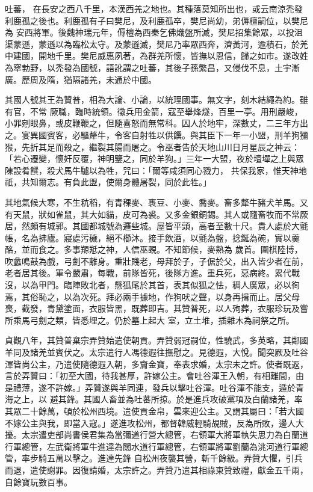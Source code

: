 
\begin{pinyinscope}

 吐蕃，
 在長安之西八千里，本漢西羌之地也。其種落莫知所出也，或云南涼禿發利鹿孤之後也。利鹿孤有子曰樊尼，及利鹿孤卒，樊尼尚幼，弟傉檀嗣位，以樊尼為
 安西將軍。後魏神瑞元年，傉檀為西秦乞佛熾盤所滅，樊尼招集餘眾，以投沮渠蒙遜，蒙遜以為臨松太守。及蒙遜滅，樊尼乃率眾西奔，濟黃河，逾積石，於羌中建國，開地千里。樊尼威惠夙著，為群羌所懷，皆撫以恩信，歸之如市。遂改姓為窣勃野，以禿發為國號，語訛謂之吐蕃，其後子孫繁昌，又侵伐不息，土宇漸廣。歷周及隋，猶隔諸羌，未通於中國。



 其國人號其王為贊普，相為大論、小論，以統理國事。無文字，刻木結繩為約。雖有官，不常
 厥職，臨時統領。徵兵用金箭，寇至舉烽燧，百里一亭。用刑嚴峻，小罪剜眼鼻，或皮鞭鞭之，但隨喜怒而無常科。囚人於地牢，深數丈，二三年方出之。宴異國賓客，必驅犛牛，令客自射牲以供饌。與其臣下一年一小盟，刑羊狗獼猴，先折其足而殺之，繼裂其腸而屠之。令巫者告於天地山川日月星辰之神云：「若心遷變，懷奸反覆，神明鑒之，同於羊狗。」三年一大盟，夜於壇墠之上與眾陳設肴饌，殺犬馬牛驢以為牲，咒曰：「爾等咸須同心戮力，
 共保我家，惟天神地祇，共知爾志。有負此盟，使爾身體屠裂，同於此牲。」



 其地氣候大寒，不生秔稻，有青稞麥、褭豆、小麥、喬麥。畜多犛牛豬犬羊馬。又有天鼠，狀如雀鼠，其大如貓，皮可為裘。又多金銀銅錫。其人或隨畜牧而不常厥居，然頗有城郭。其國都城號為邏些城。屋皆平頭，高者至數十尺。貴人處於大氈帳，名為拂廬。寢處污穢，絕不櫛沐。接手飲酒，以氈為盤，捻鋋為碗，實以羹酪，並而食之。多事羱羝之神，人信巫覡。不知節候，麥熟為
 歲首。圍棋陸博，吹蠡鳴鼓為戲，弓劍不離身。重壯賤老，母拜於子，子倨於父，出入皆少者在前，老者居其後。軍令嚴肅，每戰，前隊皆死，後隊方進。重兵死，惡病終。累代戰沒，以為甲門。臨陣敗北者，懸狐尾於其首，表其似狐之怯，稠人廣眾，必以徇焉，其俗恥之，以為次死。拜必兩手據地，作狗吠之聲，以身再揖而止。居父母喪，截發，青黛塗面，衣服皆黑，既葬即吉。其贊普死，以人殉葬，衣服珍玩及嘗所乘馬弓劍之類，皆悉埋之。仍於墓上起大
 室，立土堆，插雜木為祠祭之所。



 貞觀八年，其贊普棄宗弄贊始遣使朝貢。弄贊弱冠嗣位，性驍武，多英略，其鄰國羊同及諸羌並賓伏之。太宗遣行人馮德遐往撫慰之。見德遐，大悅。聞突厥及吐谷渾皆尚公主，乃遣使隨德遐入朝，多齎金寶，奉表求婚，太宗未之許。使者既返，言於弄贊曰：「初至大國，待我甚厚，許嫁公主。會吐谷渾王入朝，有相離間，由是禮薄，遂不許嫁。」弄贊遂與羊同連，發兵以擊吐谷渾。吐谷渾不能支，遁於青海之上，以
 避其鋒。其國人畜並為吐蕃所掠。於是進兵攻破黨項及白蘭諸羌，率其眾二十餘萬，頓於松州西境。遣使貢金帛，雲來迎公主。又謂其屬曰：「若大國不嫁公主與我，即當入寇。」遂進攻松州，都督韓威輕騎覘賊，反為所敗，邊人大擾。太宗遣吏部尚書侯君集為當彌道行營大總管，右領軍大將軍執失思力為白蘭道行軍總管，左武衛將軍牛進達為闊水道行軍總管，右領軍將軍劉蘭為洮河道行軍總管，率步騎五萬以擊之。進達先鋒
 自松州夜襲其營，斬千餘級。弄贊大懼，引兵而退，遣使謝罪。因復請婚，太宗許之。弄贊乃遣其相祿東贊致禮，獻金五千兩，自餘寶玩數百事。




\end{pinyinscope}
